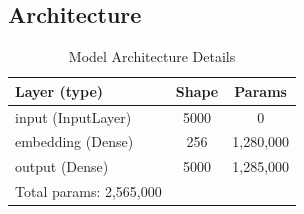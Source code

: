\documentclass[12pt]{article} \usepackage{COSC420style} \usepackage{soul}
\begin{document}
\subsection{Architecture}
\begin{table}[htbp]
	\centering
	\caption{Model Architecture Details} %
	\label{tab:model_architecture} %
	\begin{tabular}{lcc} %
		\toprule
		Layer (type)       & Shape & Params    \\
		\midrule
		input (InputLayer) & 5000  & 0         \\
		embedding (Dense)  & 256   & 1,280,000 \\
		output (Dense)     & 5000  & 1,285,000 \\
		\bottomrule
		Total params: 2,565,000
	\end{tabular}
\end{table}
\end{document}

